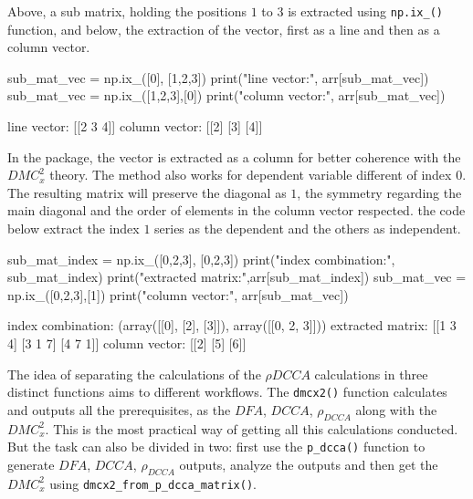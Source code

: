 \documentclass[article]{jss}
\begin{document}
Above, a sub matrix, holding the positions $1$ to $3$ is extracted using \verb"np.ix_()" function, and below, the extraction of the vector, first as a line and then as a column vector.
\begin{CodeChunk}

\begin{CodeInput}
sub_mat_vec = np.ix_([0], [1,2,3])
print("line vector:\n", arr[sub_mat_vec])
sub_mat_vec = np.ix_([1,2,3],[0])
print("column vector:\n", arr[sub_mat_vec])
\end{CodeInput}

\begin{CodeOutput}
line vector:
[[2 3 4]]
column vector:
[[2]
[3]
[4]]
\end{CodeOutput}
\end{CodeChunk}

In the  package, the vector is extracted as a column for better coherence with the $DMC_{x}^{2}$ theory. The method also works for dependent variable different of index $0$. The resulting matrix will preserve the diagonal as $1$, the symmetry regarding the main diagonal and the order of elements in the column vector respected. the code below extract the index $1$ series as the dependent and the others as independent.
\begin{CodeChunk}
\begin{CodeInput}
sub_mat_index = np.ix_([0,2,3], [0,2,3])
print("index combination:\n", sub_mat_index)
print("extracted matrix:\n",arr[sub_mat_index])
sub_mat_vec = np.ix_([0,2,3],[1])
print("column vector:\n", arr[sub_mat_vec])
\end{CodeInput}

\begin{CodeOutput}
index combination:
(array([[0],
      [2],
      [3]]), array([[0, 2, 3]]))
extracted matrix:
[[1 3 4]
[3 1 7]
[4 7 1]]
column vector:
[[2]
[5]
[6]]
\end{CodeOutput}
\end{CodeChunk}

The idea of separating the calculations of the $\rho{DCCA}$ calculations in three distinct functions aims to different workflows. The \verb"dmcx2()" function calculates and outputs all the prerequisites, as the $DFA$, $DCCA$, $\rho_{DCCA}$ along with the $DMC_{x}^{2}$. This is the most practical way of getting all this calculations conducted. But the task can also be divided in two: first use the \verb"p_dcca()" function to generate $DFA$, $DCCA$, $\rho_{DCCA}$ outputs, analyze the outputs and then get the $DMC_{x}^{2}$ using \verb"dmcx2_from_p_dcca_matrix()".
\end{document}
